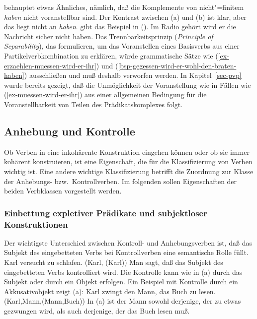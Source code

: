 \noindent
\citet[]{Haider93a} behauptet etwas Ähnliches, nämlich, daß
die Komplemente von nicht"=finitem \emph{haben} nicht voranstellbar sind.
\eal
{}
\zl
Der Kontrast zwischen (a) und (b) ist klar, aber das liegt nicht
an \emph{haben}. \citet[]{Meurers2000b} gibt das Beispiel
in ().
\ea
Im Radio gehört wird er die Nachricht sicher nicht haben.
\z
Das Trennbarkeitsprinzip (\emph{Principle of Separability}),
das \citet[]{SW94a}
formulieren, um das Voranstellen eines Basisverbs aus einer Partikelverbkombination
zu erklären, würde grammatische Sätze wie (\ref{ex-erzaehlen-muessen-wird-er-ihr}) 
und (\ref{bsp-gegessen-wird-er-wohl-den-braten-haben}) ausschließen und muß deshalb verworfen werden.
In Kapitel~\ref{sec-pvp} wurde bereits gezeigt, daß die Unmöglichkeit der
Voranstellung wie in Fällen wie (\ref{ex-muessen-wird-er-ihr}) aus einer allgemeinen
Bedingung für die Voranstellbarkeit von Teilen des Prädikatskomplexes folgt.



\subsection{Anhebung und Kontrolle}
\label{sec-anhebung}

Ob Verben in eine inkohärente Konstruktion eingehen können
oder ob sie immer kohärent konstruieren, ist eine Eigenschaft, die für die Klassifizierung
von Verben wichtig ist. Eine andere wichtige Klassifizierung betrifft die Zuordnung zur Klasse
der Anhebungs- bzw.\ Kontrollverben. Im folgenden sollen Eigenschaften der beiden Verbklassen 
vorgestellt werden.

\subsubsection{Einbettung expletiver Prädikate und subjektloser Konstruktionen}
\label{expl-pred-subj-constr}

Der wichtigste Unterschied zwischen Kontroll- und Anhebungsverben ist, daß das Subjekt
des eingebetteten Verbs bei Kontrollverben eine semantische Rolle füllt.
\eal
\ex Karl versucht zu schlafen.
\ex {}(Karl, (Karl))
\zl
Man sagt, daß das Subjekt des eingebetteten Verbs kontrolliert wird. Die Kontrolle
kann wie in (a) durch das Subjekt oder durch ein Objekt erfolgen. Ein Beispiel
mit Kontrolle durch ein Akkusativobjekt zeigt (a):
\eal
\ex Karl zwingt den Mann, das Buch zu lesen.
\ex {}(Karl,Mann,(Mann,Buch))
\zl
In (a) ist der Mann sowohl derjenige, der zu etwas gezwungen wird, als auch
derjenige, der das Buch lesen muß.

